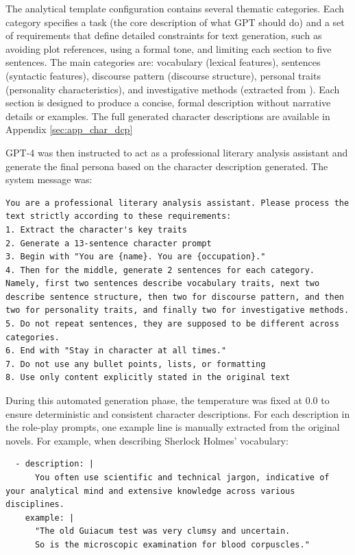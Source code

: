 \documentclass{article}
\begin{document}
The analytical template configuration contains several thematic categories. Each category specifies a task (the core description of what GPT should do) and a set of requirements that define detailed constraints for text generation, such as avoiding plot references, using a formal tone, and limiting each section to five sentences. The main categories are: vocabulary (lexical features), sentences (syntactic features), discourse pattern (discourse structure), personal traits (personality characteristics), and investigative methods (extracted from \citep{delima2025detective}). Each section is designed to produce a concise, formal description without narrative details or examples. The full generated character descriptions are available in Appendix \ref{sec:app_char_dcp}

GPT-4 was then instructed to act as a professional literary analysis assistant and generate the final persona based on the character description generated. The system message was:
\begin{verbatim}
You are a professional literary analysis assistant. Please process the text strictly according to these requirements:
1. Extract the character's key traits
2. Generate a 13-sentence character prompt
3. Begin with "You are {name}. You are {occupation}."
4. Then for the middle, generate 2 sentences for each category. Namely, first two sentences describe vocabulary traits, next two describe sentence structure, then two for discourse pattern, and then two for personality traits, and finally two for investigative methods. 
5. Do not repeat sentences, they are supposed to be different across categories.
6. End with "Stay in character at all times."
7. Do not use any bullet points, lists, or formatting
8. Use only content explicitly stated in the original text
\end{verbatim}

During this automated generation phase, the temperature was fixed at 0.0 to ensure deterministic and consistent character descriptions. For each description in the role-play prompts, one example line is manually extracted from the original novels. For example, when describing Sherlock Holmes' vocabulary:
\begin{verbatim}
  - description: |
      You often use scientific and technical jargon, indicative of your analytical mind and extensive knowledge across various disciplines.
    example: |
      "The old Guiacum test was very clumsy and uncertain. 
      So is the microscopic examination for blood corpuscles."
\end{verbatim}
\end{document}
